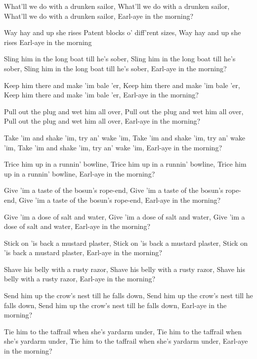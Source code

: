 \beginverse
What'll we do with a drunken sailor,
What'll we do with a drunken sailor,
What'll we do with a drunken sailor,
Earl-aye in the morning?
\endverse

\beginchorus
Way hay and up she rises
Patent blocks o' diff'rent sizes,
Way hay and up she rises
Earl-aye in the morning
\endchorus

\beginverse
Sling him in the long boat till he's sober,
Sling him in the long boat till he's sober,
Sling him in the long boat till he's sober,
Earl-aye in the morning?
\endverse

\beginverse
Keep him there and make 'im bale 'er,
Keep him there and make 'im bale 'er,
Keep him there and make 'im bale 'er,
Earl-aye in the morning?
\endverse

\beginverse
Pull out the plug and wet him all over,
Pull out the plug and wet him all over,
Pull out the plug and wet him all over,
Earl-aye in the morning?
\endverse

\beginverse
Take 'im and shake 'im, try an' wake 'im,
Take 'im and shake 'im, try an' wake 'im,
Take 'im and shake 'im, try an' wake 'im,
Earl-aye in the morning?
\endverse

\beginverse
Trice him up in a runnin' bowline,
Trice him up in a runnin' bowline,
Trice him up in a runnin' bowline,
Earl-aye in the morning?
\endverse

\beginverse
Give 'im a taste of the bosun's rope-end,
Give 'im a taste of the bosun's rope-end,
Give 'im a taste of the bosun's rope-end,
Earl-aye in the morning?
\endverse

\beginverse
Give 'im a dose of salt and water,
Give 'im a dose of salt and water,
Give 'im a dose of salt and water,
Earl-aye in the morning?
\endverse

\beginverse
Stick on 'is back a mustard plaster,
Stick on 'is back a mustard plaster,
Stick on 'is back a mustard plaster,
Earl-aye in the morning?
\endverse

\beginverse
Shave his belly with a rusty razor,
Shave his belly with a rusty razor,
Shave his belly with a rusty razor,
Earl-aye in the morning?
\endverse

\beginverse
Send him up the crow's nest till he falls down,
Send him up the crow's nest till he falls down,
Send him up the crow's nest till he falls down,
Earl-aye in the morning?
\endverse

\beginverse
Tie him to the taffrail when she's yardarm under,
Tie him to the taffrail when she's yardarm under,
Tie him to the taffrail when she's yardarm under,
Earl-aye in the morning?
\endverse

